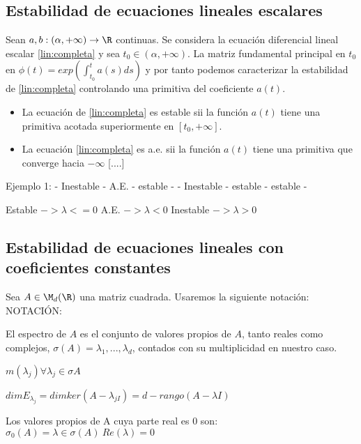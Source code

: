 \subsection{Estabilidad de ecuaciones lineales escalares}
Sean $a,b:(\alpha,+\infty)\to \R$ continuas. Se considera la ecuación diferencial lineal escalar \ref{lin:completa} y sea $t_0\in(\alpha,+\infty)$.
La matriz fundamental principal en $t_0$ en $\phi(t)=exp(\int^t_{t_0} a(s)ds)$ y por tanto podemos caracterizar la estabilidad de \ref{lin:completa} controlando una primitiva del coeficiente $a(t)$.
\begin{nprop}
\begin{itemize}
\item La ecuación de \ref{lin:completa} es estable sii la función $a(t)$ tiene una primitiva acotada superiormente en $[t_0,+\infty]$.
\item La ecuación \ref{lin:completa} es a.e. sii la función $a(t)$ tiene una primitiva que converge hacia $-\infty$ [....]
\end{itemize}
\end{nprop}
Ejemplo 1:
- Inestable
- A.E.
- estable
-
- Inestable
- estable
- estable
-


Estable $-> \lambda <= 0$
A.E. $-> \lambda < 0$
Inestable $-> \lambda > 0$

\subsection{Estabilidad de ecuaciones lineales con coeficientes constantes}
Sea $A \in \M_d(\R)$ una matriz cuadrada.  Usaremos la siguiente notación:
NOTACIÓN:
\begin{ndef}[Espectro de $A$]
El espectro de $A$ es el conjunto de valores propios de $A$, tanto reales como complejos, $\sigma(A)={\lambda_1,...,\lambda_d}$, contados con su multiplicidad en nuestro caso.
\end{ndef}
\begin{ndef}
$m(\lambda_j) \forall \lambda_j \in \sigma{A}$
\end{ndef}
\begin{ndef}
$dim E_{\lambda_j} = dim ker(A-\lambda_{jI})= d-rango(A-\lambda I)$
\end{ndef}
\begin{ndef}
Los valores propios de A cuya parte real es 0 son:
$\sigma_0(A)={\lambda \in \sigma(A) \ Re(\lambda)=0}$
\end{ndef}

